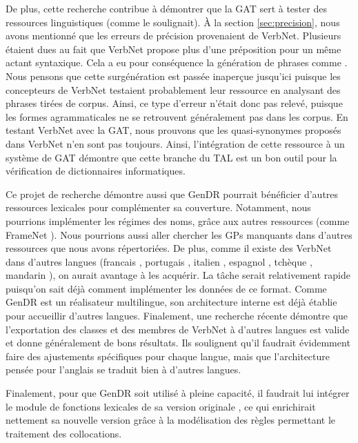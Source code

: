 De plus, cette recherche contribue à démontrer que la \ac{GAT} sert à tester des ressources linguistiques (comme \cite{DanlosPresentationmodelegeneration1983} le soulignait). À la section \ref{sec:precision}, nous avons mentionné que les erreurs de précision provenaient de VerbNet. Plusieurs étaient dues au fait que VerbNet propose plus d'une préposition pour un même actant syntaxique. Cela a eu pour conséquence la génération de phrases comme \ungr{}. Nous pensons que cette surgénération est passée inaperçue jusqu'ici puisque les concepteurs de VerbNet testaient probablement leur ressource en analysant des phrases tirées de corpus. Ainsi, ce type d'erreur n'était donc pas relevé, puisque les formes agrammaticales ne se retrouvent généralement pas dans les corpus. En testant VerbNet avec la \ac{GAT}, nous prouvons que les quasi-synonymes proposés dans VerbNet n'en sont pas toujours. Ainsi, l'intégration de cette ressource à un système de \ac{GAT} démontre que cette branche du \ac{TAL} est un bon outil pour la vérification de dictionnaires informatiques.

Ce projet de recherche démontre aussi que GenDR pourrait bénéficier d'autres ressources lexicales pour complémenter sa couverture. Notamment, nous pourrions implémenter les régimes des noms, grâce aux autres ressources (comme FrameNet \cite{FillmoreBackgroundFramenet2003a}). Nous pourrions aussi aller chercher les \acp{GP} manquants dans d'autres ressources que nous avons répertoriées. De plus, comme il existe des VerbNet dans d'autres langues (francais \citep{danlos:hal-01179175}, portugais \citep{ScartoncrosslinguisticVerbNetstylelexicon2012}, italien \citep{busso2016italian}, espagnol \citep{TauleAnCoraNetMappingSpanish2010}, tchèque \citep{pala2008can}, mandarin \citep{liu2008construction}), on aurait avantage à les acquérir. La tâche serait relativement rapide puisqu'on sait déjà comment implémenter les données de ce format. Comme GenDR est un réalisateur multilingue, son architecture interne est déjà établie pour accueillir d'autres langues. Finalement, une recherche récente \citep{Majewska2017} démontre que l'exportation des classes et des membres de VerbNet \citep{SchulerVerbnetBroadcoverageComprehensive2005} à d'autres langues est valide et donne généralement de bons résultats. Ils soulignent qu'il faudrait évidemment faire des ajustements spécifiques pour chaque langue, mais que l'architecture pensée pour l'anglais se traduit bien à d'autres langues. 

Finalement, pour que GenDR soit utilisé à pleine capacité, il faudrait lui intégrer le module de fonctions lexicales de sa version originale \citep{LambreyImplementationcollocationspour2017, lareau18}, ce qui enrichirait nettement sa nouvelle version grâce à la modélisation des règles permettant le traitement des collocations.

